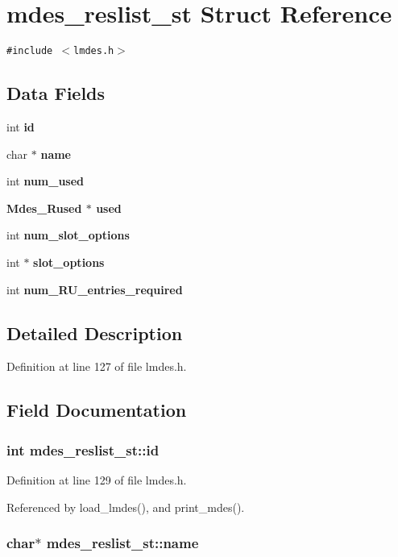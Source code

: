 \section{mdes\_\-reslist\_\-st Struct Reference}
\label{structmdes__reslist__st}
{\tt \#include $<$lmdes.h$>$}

\subsection*{Data Fields}
\begin{CompactItemize}
\item 
int \bf{id}
\item 
char $\ast$ \bf{name}
\item 
int \bf{num\_\-used}
\item 
\bf{Mdes\_\-Rused} $\ast$ \bf{used}
\item 
int \bf{num\_\-slot\_\-options}
\item 
int $\ast$ \bf{slot\_\-options}
\item 
int \bf{num\_\-RU\_\-entries\_\-required}
\end{CompactItemize}


\subsection{Detailed Description}




Definition at line 127 of file lmdes.h.

\subsection{Field Documentation}
\subsubsection{\setlength{\rightskip}{0pt plus 5cm}int \bf{mdes\_\-reslist\_\-st::id}}\label{structmdes__reslist__st_572baafd712d4130b6c172625ca33af5}




Definition at line 129 of file lmdes.h.

Referenced by load\_\-lmdes(), and print\_\-mdes().
\subsubsection{\setlength{\rightskip}{0pt plus 5cm}char$\ast$ \bf{mdes\_\-reslist\_\-st::name}}\label{structmdes__reslist__st_ec389a7080426fc5b6f4d0db8221299b}




